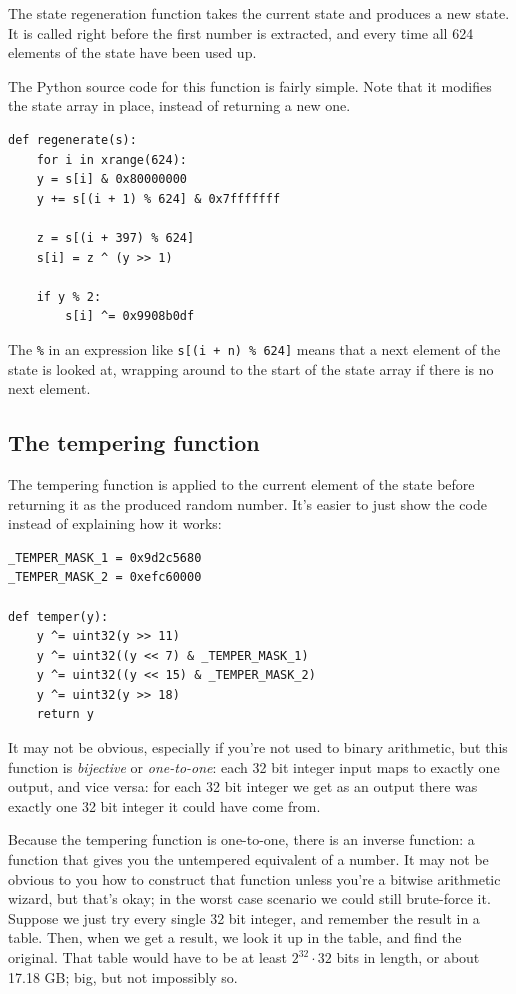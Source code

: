 \documentclass[11pt,ebook,table,dvipsnames]{memoir}
\begin{document}
The state regeneration function takes the current state and produces a
new state. It is called right before the first number is extracted,
and every time all 624 elements of the state have been used up.

The Python source code for this function is fairly simple. Note that
it modifies the state array in place, instead of returning a new one.

\begin{verbatim}
def regenerate(s):
    for i in xrange(624):
	y = s[i] & 0x80000000
	y += s[(i + 1) % 624] & 0x7fffffff

	z = s[(i + 397) % 624]
	s[i] = z ^ (y >> 1)

	if y % 2:
	    s[i] ^= 0x9908b0df
\end{verbatim}

The \verb~%~ in an expression like \verb~s[(i + n) % 624]~ means that a next
element of the state is looked at, wrapping around to the start of the
state array if there is no next element.
\subsection{The tempering function}
\label{sec-2-10-6-4}

The tempering function is applied to the current element of the state
before returning it as the produced random number. It's easier to just
show the code instead of explaining how it works:

\begin{verbatim}
_TEMPER_MASK_1 = 0x9d2c5680
_TEMPER_MASK_2 = 0xefc60000

def temper(y):
    y ^= uint32(y >> 11)
    y ^= uint32((y << 7) & _TEMPER_MASK_1)
    y ^= uint32((y << 15) & _TEMPER_MASK_2)
    y ^= uint32(y >> 18)
    return y
\end{verbatim}

It may not be obvious, especially if you're not used to binary
arithmetic, but this function is \emph{bijective} or \emph{one-to-one}: each 32
bit integer input maps to exactly one output, and vice versa: for each
32 bit integer we get as an output there was exactly one 32 bit
integer it could have come from.

Because the tempering function is one-to-one, there is an inverse
function: a function that gives you the untempered equivalent of a
number. It may not be obvious to you how to construct that function
unless you're a bitwise arithmetic wizard, but that's okay; in the
worst case scenario we could still brute-force it. Suppose we just try
every single 32 bit integer, and remember the result in a table. Then,
when we get a result, we look it up in the table, and find the
original. That table would have to be at least $2^{32} \cdot 32$ bits
in length, or about 17.18 GB; big, but not impossibly so.
\end{document}

